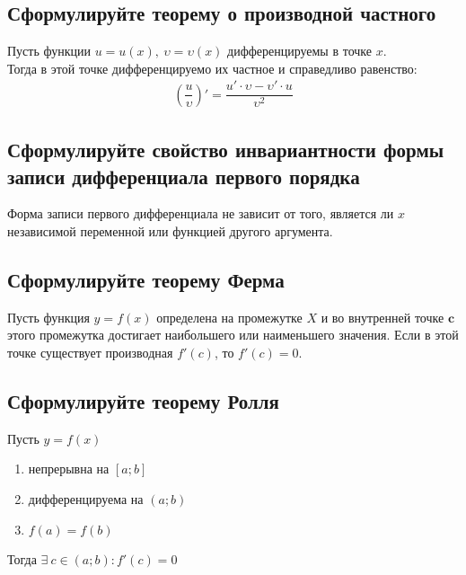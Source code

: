 \subsection{Сформулируйте теорему о производной частного}
\begin{theorem}
	Пусть функции $u = u(x),\ \upsilon = \upsilon (x)$ дифференцируемы в точке $x$.\\
	Тогда в этой точке дифференцируемо их частное и справедливо равенство:
	\begin{gather*}
		\left(\dfrac{u}{\upsilon}\right)' = \dfrac{u' \cdot \upsilon - \upsilon' \cdot u}{\upsilon^2}
	\end{gather*}
\end{theorem}

\subsection{Сформулируйте свойство инвариантности формы записи дифференциала первого порядка}
\begin{theorem}
	Форма записи первого дифференциала не зависит от того, является ли $x$ независимой переменной или функцией другого аргумента.
\end{theorem}

\subsection{Сформулируйте теорему Ферма}
\begin{theorem}
	Пусть функция $y=f(x)$ определена на промежутке $X$ и во внутренней точке $\bm{c}$ этого промежутка достигает наибольшего или наименьшего значения. Если в этой точке существует производная $f'(c)$, то $f'(c) = 0$.
\end{theorem}

\newpage
\subsection{Сформулируйте теорему Ролля}
\begin{theorem}
	Пусть $y=f(x)$
	\begin{enumerate}
		\item непрерывна на $[a;b]$
		\item дифференцируема на $(a;b)$
		\item $f(a) = f(b)$
	\end{enumerate}
	Тогда $\exists\ c \in (a;b)\colon f'(c) = 0$
\end{theorem}

